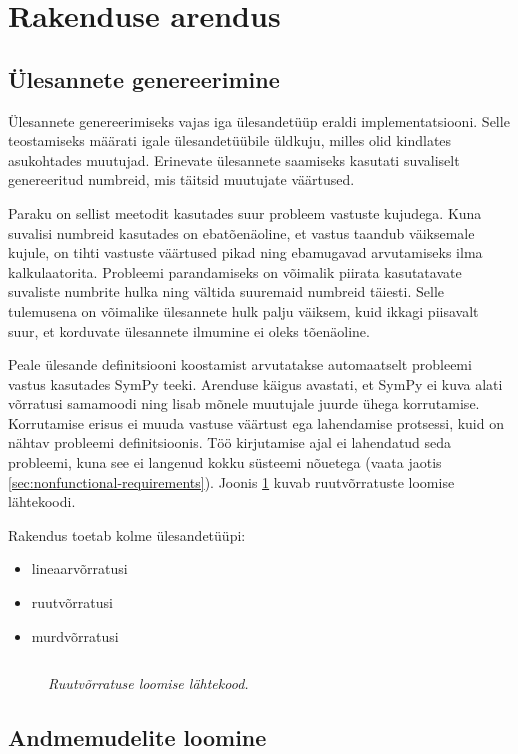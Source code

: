 \section{Rakenduse arendus}

\subsection{Ülesannete genereerimine}

Ülesannete genereerimiseks vajas iga ülesandetüüp eraldi implementatsiooni. Selle teostamiseks määrati igale ülesandetüübile üldkuju, milles olid kindlates asukohtades muutujad. Erinevate ülesannete saamiseks kasutati suvaliselt genereeritud numbreid, mis täitsid muutujate väärtused.

Paraku on sellist meetodit kasutades suur probleem vastuste kujudega. Kuna suvalisi numbreid kasutades on ebatõenäoline, et vastus taandub väiksemale kujule, on tihti vastuste väärtused pikad ning ebamugavad arvutamiseks ilma kalkulaatorita. Probleemi parandamiseks on võimalik piirata kasutatavate suvaliste numbrite hulka ning vältida suuremaid numbreid täiesti. Selle tulemusena on võimalike ülesannete hulk palju väiksem, kuid ikkagi piisavalt suur, et korduvate ülesannete ilmumine ei oleks tõenäoline.

Peale ülesande definitsiooni koostamist arvutatakse automaatselt probleemi vastus kasutades SymPy teeki. Arenduse käigus avastati, et SymPy ei kuva alati võrratusi samamoodi ning lisab mõnele muutujale juurde ühega korrutamise. Korrutamise erisus ei muuda vastuse väärtust ega lahendamise protsessi, kuid on nähtav probleemi definitsioonis. Töö kirjutamise ajal ei lahendatud seda probleemi, kuna see ei langenud kokku süsteemi nõuetega (vaata jaotis \ref{sec:nonfunctional-requirements}). Joonis \ref{fig:maths} kuvab ruutvõrratuste loomise lähtekoodi.

Rakendus toetab kolme ülesandetüüpi:
\begin{itemize}
  \item lineaarvõrratusi
  \item ruutvõrratusi
  \item murdvõrratusi
\end{itemize}

\begin{figure}
\inputminted[breaklines]{py}{chapters/data/maths.py}
\caption{\emph{Ruutvõrratuse loomise lähtekood.}}\label{fig:maths}
\end{figure}

\subsection{Andmemudelite loomine}


